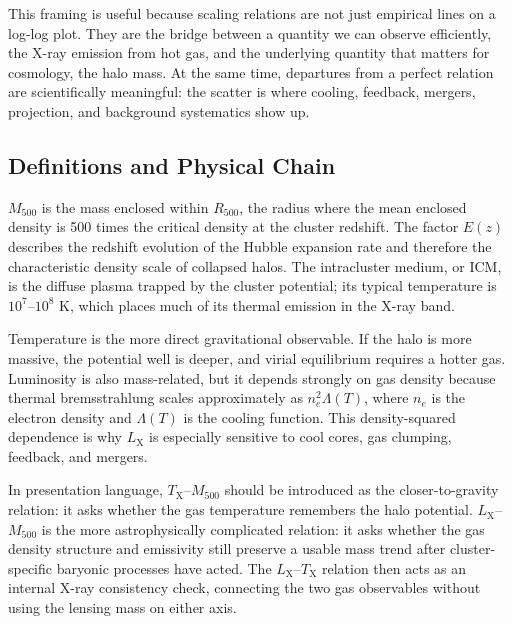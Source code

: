 \documentclass[11pt]{article}
\newcommand{\Mfive}{\ensuremath{M_{500}}}
\newcommand{\Rfive}{\ensuremath{R_{500}}}
\newcommand{\Lx}{\ensuremath{L_{\mathrm{X}}}}
\newcommand{\Tx}{\ensuremath{T_{\mathrm{X}}}}
\newcommand{\Ez}{\ensuremath{E(z)}}
\begin{document}
This framing is useful because scaling relations are not just empirical lines on a log-log plot. They are the bridge between a quantity we can observe efficiently, the X-ray emission from hot gas, and the underlying quantity that matters for cosmology, the halo mass. At the same time, departures from a perfect relation are scientifically meaningful: the scatter is where cooling, feedback, mergers, projection, and background systematics show up.

\subsection{Definitions and Physical Chain}

\Mfive{} is the mass enclosed within \Rfive{}, the radius where the mean enclosed density is 500 times the critical density at the cluster redshift. The factor \Ez{} describes the redshift evolution of the Hubble expansion rate and therefore the characteristic density scale of collapsed halos. The intracluster medium, or ICM, is the diffuse plasma trapped by the cluster potential; its typical temperature is $10^7$--$10^8$ K, which places much of its thermal emission in the X-ray band.

Temperature is the more direct gravitational observable. If the halo is more massive, the potential well is deeper, and virial equilibrium requires a hotter gas. Luminosity is also mass-related, but it depends strongly on gas density because thermal bremsstrahlung scales approximately as $n_e^2\Lambda(T)$, where $n_e$ is the electron density and $\Lambda(T)$ is the cooling function. This density-squared dependence is why \Lx{} is especially sensitive to cool cores, gas clumping, feedback, and mergers.

In presentation language, \Tx--\Mfive{} should be introduced as the closer-to-gravity relation: it asks whether the gas temperature remembers the halo potential. \Lx--\Mfive{} is the more astrophysically complicated relation: it asks whether the gas density structure and emissivity still preserve a usable mass trend after cluster-specific baryonic processes have acted. The \Lx--\Tx{} relation then acts as an internal X-ray consistency check, connecting the two gas observables without using the lensing mass on either axis.
\end{document}
